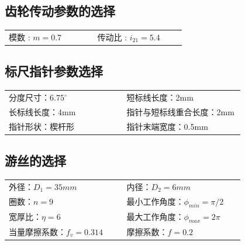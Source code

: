 \subsection{齿轮传动参数的选择}
\begin{tabular}{@{}>{\raggedright\arraybackslash}p{0.4\linewidth}>{\raggedright\arraybackslash}p{0.4\linewidth}@{}}
模数 : $m=0.7$ &传动比 : $i_{21}=5.4$\\
\end{tabular}
\subsection{标尺指针参数选择}
\begin{tabular}{@{}>{\raggedright\arraybackslash}p{0.4\linewidth}>{\raggedright\arraybackslash}p{0.4\linewidth}@{}}
分度尺寸：$6.75^{\circ}$ & 短标线长度：2mm\\
长标线长度：4mm & 指针与短标线重合长度：2mm\\
指针形状：楔杆形& 指针末端宽度：0.5mm
\end{tabular}
\subsection{游丝的选择}
\begin{tabular}{@{}>{\raggedright\arraybackslash}p{0.4\linewidth}>{\raggedright\arraybackslash}p{0.4\linewidth}@{}}
外径：$D_1=35mm$ & 内径：$D_2=6mm$\\
圈数：$n=9$ & 最小工作角度：$\phi_{min}={\pi}/{2}$\\
宽厚比：$\eta=6$ & 最大工作角度：$\phi_{max}=2{\pi}$\\
当量摩擦系数：$f_v=0.314$ & 摩擦系数：$f=0.2$
\end{tabular}